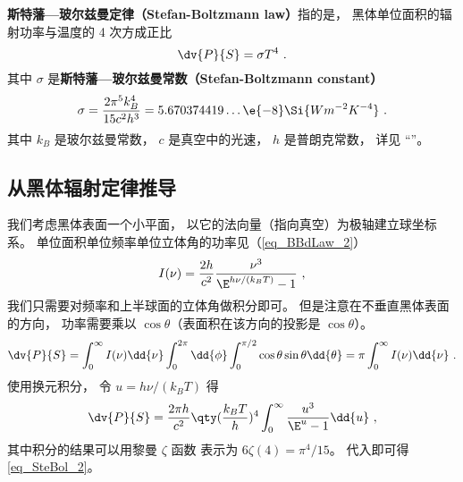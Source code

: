 
\textbf{斯特藩—玻尔兹曼定律（Stefan-Boltzmann law）}指的是， 黑体单位面积的辐射功率与温度的 4 次方成正比
\begin{equation}\label{eq_SteBol_2}
\dv{P}{S} = \sigma T^4~.
\end{equation}
其中 $\sigma$ 是\textbf{斯特藩—玻尔兹曼常数（Stefan-Boltzmann constant）}
\begin{equation}
\sigma = \frac{2\pi^5k_B^4}{15c^2h^3} = 5.670374419\dots \e{-8} \Si{Wm^{-2}K^{-4}}~.
\end{equation}
其中 $k_B$ 是玻尔兹曼常数， $c$ 是真空中的光速， $h$ 是普朗克常数， 详见 “”。

\subsection{从黑体辐射定律推导}

我们考虑黑体表面一个小平面， 以它的法向量（指向真空）为极轴建立球坐标系。 单位面积单位频率单位立体角的功率见（\autoref{eq_BBdLaw_2}）
\begin{equation}\label{eq_SteBol_1}
I(\nu) = \frac{2h}{c^2} \frac{\nu^3}{\E^{h\nu/(k_B T)} - 1}~,
\end{equation}
我们只需要对频率和上半球面的立体角做积分即可。 但是注意在不垂直黑体表面的方向， 功率需要乘以 $\cos\theta$（表面积在该方向的投影是 $\cos\theta$）。
\begin{equation}
\dv{P}{S} = \int_0^\infty I(\nu) \dd{\nu} \int_0^{2\pi} \dd{\phi} \int_0^{\pi/2}\cos\theta\sin\theta\dd{\theta}
= \pi \int_0^\infty I(\nu) \dd{\nu}~.
\end{equation}
使用换元积分， 令 $u = h\nu/(k_BT)$ 得
\begin{equation}
\dv{P}{S} = \frac{2\pi h}{c^2} \qty(\frac{k_B T}{h})^4 \int_0^\infty \frac{u^3}{\E^u - 1}\dd{u}~,
\end{equation}
其中积分的结果可以用黎曼 $\zeta$ 函数%
表示为 $6\zeta(4) = \pi^4/15$。 代入即可得\autoref{eq_SteBol_2}。%
